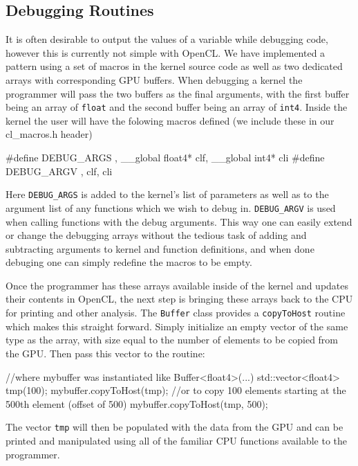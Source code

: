 \subsection{Debugging Routines}

It is often desirable to output the values of a variable while debugging code,
however this is currently not simple with OpenCL. We have implemented a pattern
using a set of macros in the kernel source code as well as two dedicated arrays
with corresponding GPU buffers. When debugging a kernel the programmer will
pass the two buffers as the final arguments, with the first buffer being an
array of \verb|float| and the second buffer being an array of \verb|int4|. 
Inside the kernel the user will have the folowing macros defined (we include
these in our cl\_macros.h header)
\begin{cppcode}{0}
#define DEBUG_ARGS  , __global float4* clf, __global int4* cli
#define DEBUG_ARGV  , clf, cli
\end{cppcode}

Here \verb|DEBUG_ARGS| is added to the kernel's list of parameters as well as
to the argument list of any functions which we wish to debug in.
\verb|DEBUG_ARGV| is used when calling functions with the debug arguments. This
way one can easily extend or change the debugging arrays without the tedious
task of adding and subtracting arguments to kernel and function definitions,
and when done debuging one can simply redefine the macros to be empty.

Once the programmer has these arrays available inside of the kernel and updates
their contents in OpenCL, the next step is bringing these arrays back to the
CPU for printing and other analysis. The \verb|Buffer| class provides a
\verb|copyToHost| routine which makes this straight forward. Simply initialize
an empty vector of the same type as the array, with size equal to the
number of elements to be copied from the GPU. Then pass this vector to the routine:
\begin{cppcode}{0}
//where mybuffer was instantiated like Buffer<float4>(...)
std::vector<float4> tmp(100);
mybuffer.copyToHost(tmp);
//or to copy 100 elements starting at the 500th element (offset of 500)
mybuffer.copyToHost(tmp, 500);
\end{cppcode}

The vector \verb|tmp| will then be populated with the data from the GPU and can
be printed and manipulated using all of the familiar CPU functions available to
the programmer. 

